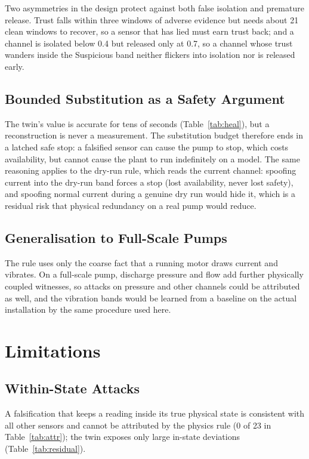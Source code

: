 \documentclass[11pt,a4paper]{article}
\begin{document}
Two asymmetries in the design protect against both false isolation and premature release. Trust falls within three windows of adverse evidence but needs about 21 clean windows to recover, so a sensor that has lied must earn trust back; and a channel is isolated below 0.4 but released only at 0.7, so a channel whose trust wanders inside the Suspicious band neither flickers into isolation nor is released early.

\subsection{Bounded Substitution as a Safety Argument}

The twin's value is accurate for tens of seconds (Table~\ref{tab:heal}), but a reconstruction is never a measurement. The substitution budget therefore ends in a latched safe stop: a falsified sensor can cause the pump to stop, which costs availability, but cannot cause the plant to run indefinitely on a model. The same reasoning applies to the dry-run rule, which reads the current channel: spoofing current into the dry-run band forces a stop (lost availability, never lost safety), and spoofing normal current during a genuine dry run would hide it, which is a residual risk that physical redundancy on a real pump would reduce.

\subsection{Generalisation to Full-Scale Pumps}

The rule uses only the coarse fact that a running motor draws current and vibrates. On a full-scale pump, discharge pressure and flow add further physically coupled witnesses, so attacks on pressure and other channels could be attributed as well, and the vibration bands would be learned from a baseline on the actual installation by the same procedure used here.

\section{Limitations}
\label{sec:limits}

\subsection{Within-State Attacks}

A falsification that keeps a reading inside its true physical state is consistent with all other sensors and cannot be attributed by the physics rule (0 of 23 in Table~\ref{tab:attr}); the twin exposes only large in-state deviations (Table~\ref{tab:residual}).
\end{document}
